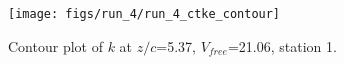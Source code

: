 \begin{figure}[H]
\centering
\texttt{[image: figs/run\_4/run\_4\_ctke\_contour]}
\caption{Contour plot of $k$ at $z/c$=5.37, $V_{free}$=21.06, station 1.}
\label{fig:run_4_ctke_contour}
\end{figure}


